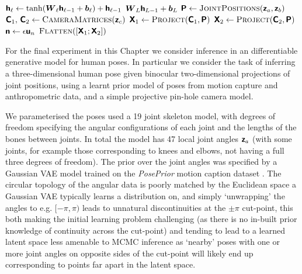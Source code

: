 \begin{algorithm}
\begin{algorithmic}
    \State $\rvct{h}_\ell \gets \tanh\lpa \mtx{W}_\ell \rvct{h}_{\ell -1} + \vct{b}_\ell \rpa + \rvct{h}_{\ell - 1}$
  \EndFor
  \State \Return $\boldsymbol{W}_{L}\boldsymbol{\mathsf{h}}_{L-1} + \boldsymbol{b}_L$
\EndFunction
{}
  \State $\rvct{P} \gets \Call{JointPositions}{\rvct{z}_a,\rvct{z}_b}$
  \State $\rvct{C}_1,\,\rvct{C}_2 \gets \Call{CameraMatrices}{\rvct{z}_c}$
  \State $\rvct{X}_1 \gets \Call{Project}{\rvct{C}_1, \rvct{P}}$
  \State $\rvct{X}_2 \gets \Call{Project}{\rvct{C}_2, \rvct{P}}$
  \State $\boldsymbol{\mathsf{n}} \gets \epsilon \boldsymbol{\mathsf{u}}_n$ 
  \State \Return $\Call{Flatten}{[\rvct{X}_1; \rvct{X}_2]}$
\EndFunction
\end{algorithmic}
\end{algorithm}

For the final experiment in this Chapter we consider inference in an differentiable generative model for human poses. In particular we consider the task of inferring a three-dimensional human pose given binocular two-dimensional projections of joint positions, using a learnt prior model of poses from motion capture and anthropometric data, and a simple projective pin-hole camera model. %


We parameterised the poses used a 19 joint skeleton model, with degrees of freedom specifying the angular configurations of each joint and the lengths of the bones between joints. In total the model has 47 local joint angles $\boldsymbol{\mathsf{z}}_a$ (with some joints, for example those corresponding to knees and elbows, not having a full three degrees of freedom). The prior over the joint angles was specified by a Gaussian \ac{VAE} model trained on the \emph{PosePrior} motion caption dataset \citep{akhter2015pose}. The circular topology of the angular data is poorly matched by the Euclidean space a Gaussian \ac{VAE} typically learns a distribution on, and simply `unwrapping' the angles to e.g. $[-\pi,\pi)$ leads to unnatural discontinuities at the $\pm \pi$ cut-point, this both making the initial learning problem challenging (as there is no in-built prior knowledge of continuity across the cut-point) and tending to lead to a learned latent space less amenable to \ac{MCMC} inference as `nearby' poses with one or more joint angles on opposite sides of the cut-point will likely end up corresponding to points far apart in the latent space.

